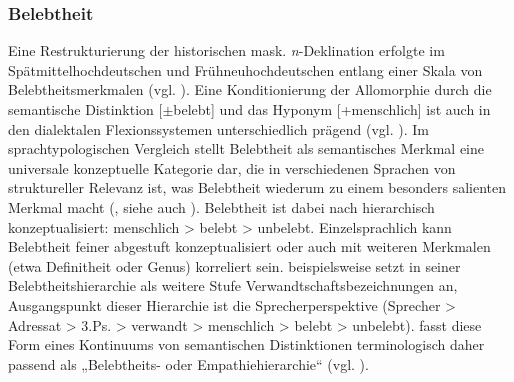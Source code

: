 \subsubsection{Belebtheit}
\label{sec:8.3.2.2}
Eine Restrukturierung der historischen mask. \textit{n}{}-Deklination erfolgte im Spätmittelhochdeutschen und Frühneuhochdeutschen entlang einer Skala von Belebtheitsmerkmalen (vgl. ). Eine Konditionierung der Allomorphie durch die semantische Distinktion [${\pm}$belebt] und das Hyponym [+menschlich] ist auch in den dialektalen Flexionssystemen unterschiedlich prägend (vgl. \citealt{Kürschner2008b}). Im sprachtypologischen Vergleich stellt Belebtheit als semantisches Merkmal eine universale konzeptuelle Kategorie dar, die in verschiedenen Sprachen von struktureller Relevanz ist, was Belebtheit wiederum zu einem besonders salienten Merkmal macht (\citealt[181]{Comrie1981}, siehe auch \citealt{Köpcke2000a}). Belebtheit ist dabei nach \citet[178]{Comrie1981} hierarchisch konzeptualisiert: menschlich > belebt > unbelebt. Einzelsprachlich kann Belebtheit feiner abgestuft konzeptualisiert oder auch mit weiteren Merkmalen (etwa Definitheit oder Genus) korreliert sein. \citet[56]{Corbett2000} beispielsweise setzt in seiner Belebtheitshierarchie als weitere Stufe Verwandtschaftsbezeichnungen an, Ausgangspunkt dieser Hierarchie ist die Sprecherperspektive (Sprecher > Adressat > 3.Ps. > verwandt > menschlich > belebt > unbelebt). \citet{Kasper2017} fasst diese Form eines Kontinuums von semantischen Distinktionen terminologisch daher passend als „Belebtheits- oder Empathiehierarchie“ (vgl. \citealt{Kasper2020}).

